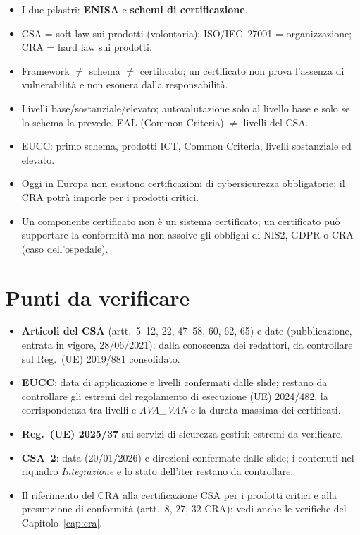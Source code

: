 
\begin{esame}
\begin{itemize}
  \item I due pilastri: \textbf{ENISA} e \textbf{schemi di certificazione}.
  \item CSA = soft law sui prodotti (volontaria); ISO/IEC~27001 = organizzazione; CRA = hard law sui
    prodotti.
  \item Framework $\neq$ schema $\neq$ certificato; un certificato non prova l'assenza di vulnerabilità e
    non esonera dalla responsabilità.
  \item Livelli base/sostanziale/elevato; autovalutazione solo al livello base e solo se lo schema la
    prevede. EAL (Common Criteria) $\neq$ livelli del CSA.
  \item EUCC: primo schema, prodotti ICT, Common Criteria, livelli sostanziale ed elevato.
  \item Oggi in Europa non esistono certificazioni di cybersicurezza obbligatorie; il CRA potrà imporle
    per i prodotti critici.
  \item Un componente certificato non è un sistema certificato; un certificato può supportare la
    conformità ma non assolve gli obblighi di NIS2, GDPR o CRA (caso dell'ospedale).
\end{itemize}
\end{esame}

\section{Punti da verificare}
\label{sec:csa-verifica}
\begin{verifica}
\begin{itemize}
  \item \textbf{Articoli del CSA} (artt.~5--12, 22, 47--58, 60, 62, 65) e date (pubblicazione,
    entrata in vigore, 28/06/2021): dalla conoscenza dei redattori, da controllare sul Reg.~(UE)
    2019/881 consolidato.
  \item \textbf{EUCC}: data di applicazione e livelli confermati dalle slide; restano da controllare gli
    estremi del regolamento di esecuzione (UE) 2024/482, la corrispondenza tra livelli e
    \emph{AVA\_VAN} e la durata massima dei certificati.
  \item \textbf{Reg.~(UE) 2025/37} sui servizi di sicurezza gestiti: estremi da verificare.
  \item \textbf{CSA~2}: data (20/01/2026) e direzioni confermate dalle slide; i contenuti nel riquadro
    \emph{Integrazione} e lo stato dell'iter restano da controllare.
  \item Il riferimento del CRA alla certificazione CSA per i prodotti critici e alla presunzione di
    conformità (artt.~8, 27, 32 CRA): vedi anche le verifiche del Capitolo~\ref{cap:cra}.
\end{itemize}
\end{verifica}
